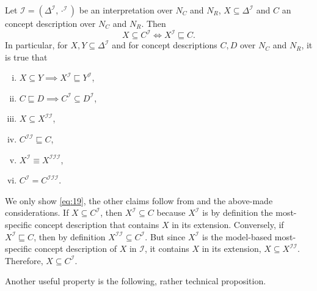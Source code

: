 \begin{Lemma}
  \label{lem:mmsc-and-extension-are-galois-connection}
  Let $\mathcal{I} = (\Delta^{\mathcal{I}}, \cdot^{\mathcal{I}})$ be an interpretation
  over $N_C$ and $N_R$, $X \subseteq \Delta^{\mathcal{I}}$ and $C$ an \ELgfpbot concept
  description over $N_C$ and $N_R$.  Then
  \begin{equation}
    \label{eq:19}
    X \subseteq C^{\mathcal{I}} \iff X^{\mathcal{I}} \sqsubseteq C.
  \end{equation}
  In particular, for $X, Y \subseteq \Delta^{\mathcal{I}}$ and for \ELgfpbot concept
  descriptions $C, D$ over $N_C$ and $N_R$, it is true that
  \begin{enumerate}[i. ]
  \item $X \subseteq Y \implies X^{\mathcal{I}} \sqsubseteq Y^{\mathcal{I}}$,
  \item $C \sqsubseteq D \implies C^{\mathcal{I}} \subseteq D^{\mathcal{I}}$,
  \item $X \subseteq X^{\mathcal{I}\mathcal{I}}$,
  \item $C^{\mathcal{I}\mathcal{I}} \sqsubseteq C$,
  \item $X^{\mathcal{I}} \equiv X^{\mathcal{I}\mathcal{I}\mathcal{I}}$,
  \item $C^{\mathcal{I}} = C^{\mathcal{I}\mathcal{I}\mathcal{I}}$.
  \end{enumerate}
\end{Lemma}
\begin{Proof}
  We only show \eqref{eq:19}, the other claims follow from
   and the above-made considerations.  If $X
  \subseteq C^{\mathcal{I}}$, then $X^{\mathcal{I}} \subseteq C$ because $X^{\mathcal{I}}$
  is by definition the most-specific concept description that contains $X$ in its
  extension.  Conversely, if $X^{\mathcal{I}} \sqsubseteq C$, then by definition
  $X^{\mathcal{I}\mathcal{I}} \subseteq C^{\mathcal{I}}$.  But since $X^{\mathcal{I}}$ is
  the model-based most-specific concept description of $X$ in $\mathcal{I}$, it contains
  $X$ in its extension, \ie $X \subseteq X^{\mathcal{I}\mathcal{I}}$.  Therefore, $X
  \subseteq C^{\mathcal{I}}$.
\end{Proof}

Another useful property is the following, rather technical proposition.


